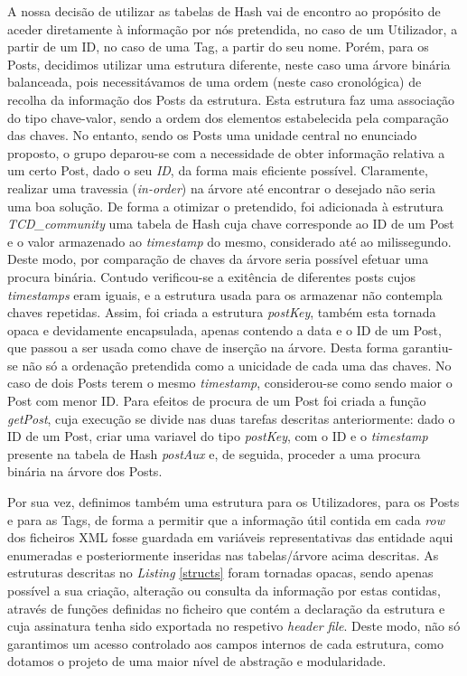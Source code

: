 \documentclass[a4paper, 11pt, oneside]{article}
\begin{document}
A nossa decisão de utilizar as tabelas de Hash vai de encontro ao propósito de aceder diretamente à informação por nós pretendida, no caso de um Utilizador, a partir de um ID, no caso de uma Tag, a partir do seu nome. Porém, para os Posts, decidimos utilizar uma estrutura diferente, neste caso uma árvore binária balanceada, pois necessitávamos de uma ordem (neste caso cronológica) de recolha da informação dos Posts da estrutura. Esta estrutura faz uma associação do tipo chave-valor, sendo a ordem dos elementos estabelecida pela comparação das chaves. No entanto, sendo os Posts uma unidade central no enunciado proposto, o grupo deparou-se com a necessidade de obter informação relativa a um certo Post, dado o seu \textit{ID}, da forma mais eficiente possível. Claramente, realizar uma travessia (\textit{in-order}) na árvore até encontrar o desejado não seria uma boa solução. De forma a otimizar o pretendido, foi adicionada à estrutura \textit{TCD\_community} uma tabela de Hash cuja chave corresponde ao ID de um Post e o valor armazenado ao \textit{timestamp} do mesmo, considerado até ao milissegundo. Deste modo, por comparação de chaves da árvore seria possível efetuar uma procura binária. Contudo verificou-se a exitência de diferentes posts cujos \textit{timestamps} eram iguais, e a estrutura usada para os armazenar não contempla chaves repetidas. Assim, 
foi criada a estrutura \textit{postKey}, também esta tornada opaca e devidamente encapsulada, apenas contendo a data e o ID de um Post, que passou a ser usada como chave de inserção na árvore. Desta forma garantiu-se não só a ordenação pretendida como a unicidade de cada uma das chaves. No caso de dois Posts terem o mesmo \textit{timestamp}, considerou-se como sendo maior o Post com menor ID. Para efeitos de procura de um Post foi criada a função \textit{getPost}, cuja execução se divide nas duas tarefas descritas anteriormente: dado o ID de um Post, criar uma variavel do tipo \textit{postKey}, com o ID e o \textit{timestamp} presente na tabela de Hash \textit{postAux} e, de seguida, proceder a uma procura binária na árvore dos Posts.

Por sua vez, definimos também uma estrutura para os Utilizadores, para os Posts e para as Tags, de forma a permitir que a informação útil contida em cada \textit{row} dos ficheiros XML fosse guardada em variáveis representativas das entidade aqui enumeradas e posteriormente inseridas nas tabelas/árvore acima descritas. As estruturas descritas no \textit{Listing} \ref{structs} foram tornadas opacas, sendo apenas possível a sua criação, alteração ou consulta da informação por estas contidas, através de funções definidas no ficheiro que contém a declaração da estrutura e cuja assinatura tenha sido exportada no respetivo \textit{header file}. Deste modo, não só garantimos um acesso controlado aos campos internos de cada estrutura, como dotamos o projeto de uma maior nível de abstração e modularidade.
\end{document}

